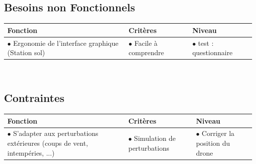 \documentclass[12pt,a4paper]{article}
\begin{document}
\subsection{Besoins non Fonctionnels}

\begin{tabular}{|p{7cm}|p{5cm}|p{4cm}|}
	\hline
       Fonction  & Critères  & Niveau\\
    \hline
    	$\bullet$ Ergonomie de l'interface graphique (Station sol) & $\bullet$ Facile à comprendre & $\bullet$ test : questionnaire\\
    \hline
\end{tabular}\\

\subsection{Contraintes}


\begin{tabular}{|p{7cm}|p{5cm}|p{4cm}|}
	\hline
       Fonction  & Critères  & Niveau\\
    \hline
    	$\bullet$ S'adapter aux perturbations extérieures (coups de vent, intempéries, ...) & $\bullet$ Simulation de perturbations & $\bullet$ Corriger la position du drone \\
    \hline
\end{tabular}\\
\newline
\end{document}

